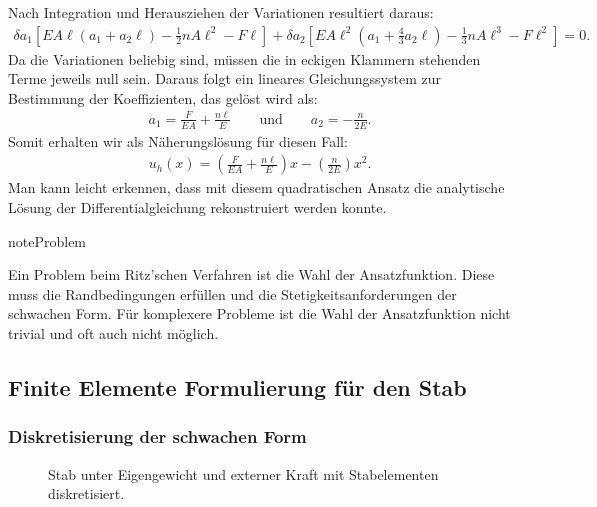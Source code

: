 \documentclass[letterpaper,10pt,german]{jupyterBook}
\let\sphinxpxdimen\pdfpxdimen\else\newdimen\sphinxpxdimen
\begin{document}
\sphinxAtStartPar
Nach Integration und Herausziehen der Variationen resultiert daraus:
\begin{equation*}
\begin{split}\delta a_1\left[EA \ell (a_1 + a_2 \ell) - \frac{1}{2} n A \ell^2 - F \ell\right] + \delta a_2 \left[EA\ell^2(a_1 + \frac{4}{3}a_2\ell) - \frac{1}{3}nA\ell^3 - F\ell^2\right] = 0.\end{split}
\end{equation*}
\sphinxAtStartPar
Da die Variationen beliebig sind, müssen die in eckigen Klammern stehenden Terme jeweils null sein. Daraus folgt ein lineares Gleichungssystem zur Bestimmung der Koeffizienten, das gelöst wird als:
\begin{equation*}
\begin{split}a_1 = \frac{F}{EA} + \frac{n \ell}{E} \qquad \text{und} \qquad  a_2 = -\frac{n}{2E}.\end{split}
\end{equation*}
\sphinxAtStartPar
Somit erhalten wir als Näherungslösung für diesen Fall:
\begin{equation*}
\begin{split}u_h(x) = \left(\frac{F}{EA} + \frac{n \ell}{E}\right)x - \left(\frac{n}{2E}\right)x^2.\end{split}
\end{equation*}
\sphinxAtStartPar
Man kann leicht erkennen, dass mit diesem quadratischen Ansatz die analytische Lösung der Differentialgleichung rekonstruiert werden konnte.

\begin{sphinxadmonition}{note}{Problem}

\sphinxAtStartPar
Ein Problem beim Ritz’schen Verfahren ist die Wahl der Ansatzfunktion. Diese muss die Randbedingungen erfüllen und die Stetigkeitsanforderungen der schwachen Form. Für komplexere Probleme ist die Wahl der Ansatzfunktion nicht trivial und oft auch nicht möglich.
\end{sphinxadmonition}




\subsection{Finite Elemente Formulierung für den Stab}
\label{\detokenize{chapters/chapter2/1dFEM:finite-elemente-formulierung-fur-den-stab}}

\subsubsection{Diskretisierung der schwachen Form}
\label{\detokenize{chapters/chapter2/1dFEM:diskretisierung-der-schwachen-form}}
\begin{figure}[htbp]
\centering
\capstart

\noindent\sphinxincludegraphics[width=600\sphinxpxdimen]{{Stab_element}.png}
\caption{Stab unter Eigengewicht und externer Kraft mit Stabelementen diskretisiert.}\label{\detokenize{chapters/chapter2/1dFEM:stabelement}}\end{figure}
\end{document}
